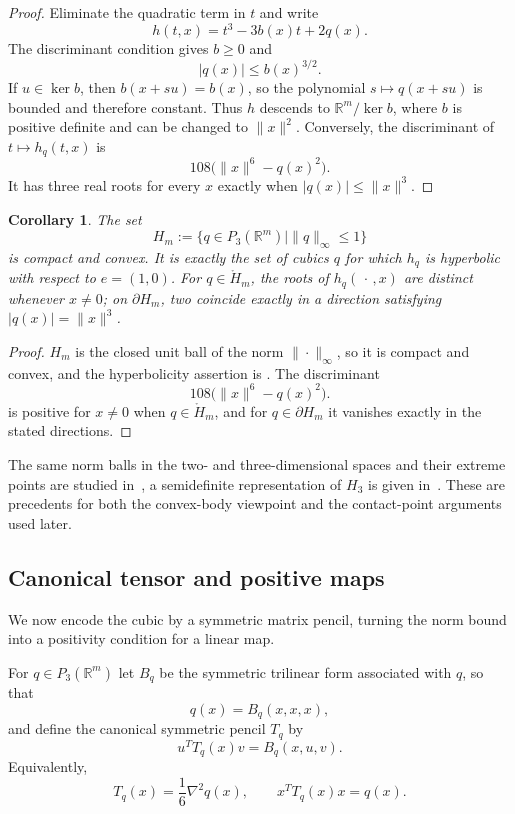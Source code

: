 \documentclass[11pt,onecolumn]{article}
\theoremstyle{blueplain}
\newtheorem{corollary}[corollary]{Corollary}
\theoremstyle{bluedefinition}
\theoremstyle{bluedefinition}
\newcommand{\R}{\mathbb R}
\begin{document}
\begin{proof}
Eliminate the quadratic term in $t$ and write
\[
h(t,x)=t^3-3b(x)t+2q(x).
\]
The discriminant condition gives $b\geqslant0$ and
\[
|q(x)|\leqslant b(x)^{3/2}.
\]
If $u\in\ker b$, then $b(x+su)=b(x)$, so the polynomial
$s\mapsto q(x+su)$ is bounded and therefore constant. Thus $h$ descends to
$\R^m/\ker b$, where $b$ is positive definite and can be changed to
$\|x\|^2$.
Conversely, the discriminant of $t\mapsto h_q(t,x)$ is
\[
108\bigl(\|x\|^6-q(x)^2\bigr).
\]
It has three real roots for every $x$ exactly when $|q(x)|\leqslant\|x\|^3$.
\end{proof}

\begin{corollary}\label{p:Hm}
The set
\[
H_m:=\{q\in P_3(\R^m)\mid\|q\|_\infty\leqslant1\}
\]
is compact and convex. It is exactly the set of cubics $q$ for which $h_q$ is
hyperbolic with respect to $e=(1,0)$. For $q\in\mathring H_m$, the roots of $h_q(\,\cdot\,,x)$ are distinct whenever
$x\ne0$; on $\partial H_m$, two coincide exactly in a direction satisfying
$|q(x)|=\|x\|^3$.
\end{corollary}

\begin{proof}
$H_m$ is the closed unit ball of the norm $\|\cdot\|_\infty$, so it is compact
and convex, and the hyperbolicity assertion is . The discriminant
\[
108\bigl(\|x\|^6-q(x)^2\bigr).
\]
is positive for $x\ne0$ when $q\in\mathring H_m$, and for
$q\in\partial H_m$ it vanishes exactly in the stated directions.
\end{proof}

The same norm balls in the two- and three-dimensional
spaces and their extreme points are studied in~\cite{HildebrandIvanova}, 
a semidefinite representation of $H_3$ is given
in~\cite{Hildebrand}.
These are precedents for both the convex-body viewpoint and the
contact-point arguments used later.

\subsection{Canonical tensor and positive maps}

We now encode the cubic by a symmetric matrix pencil, turning the
norm bound into a positivity condition for a linear map.

For $q\in P_3(\R^m)$ let $B_q$ be the symmetric trilinear form associated with $q$, so that
$$q(x)=B_q(x,x,x),$$ and define the canonical symmetric pencil $T_q$ by
\[
u^TT_q(x)v=B_q(x,u,v).
\]
Equivalently,
\[
T_q(x)=\frac16\nabla^2q(x),\qquad x^TT_q(x)x=q(x).
\]
\end{document}
